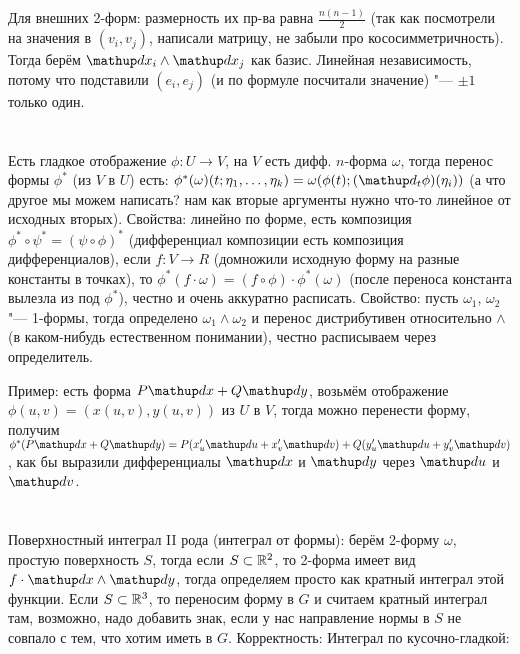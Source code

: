 Для внешних 2-форм: размерность их пр-ва равна $\frac{n(n-1)}{2}$ (так как посмотрели на значения в $(v_i, v_j)$, написали матрицу, не забыли про кососимметричность).
Тогда берём $\d x_i \wedge \d x_j$ как базис.
Линейная независимость, потому что подставили $(e_i, e_j)$ (и по формуле посчитали значение) "--- $\pm 1$ только один.

\section{} %
Есть гладкое отображение $\phi \colon U \to V$, на $V$ есть дифф. $n$-форма $\omega$, тогда перенос формы $\phi^*$ (из $V$ в $U$) есть:
$\phi^*(\omega)(t;\eta_1, \dots, \eta_k)=\omega(\phi(t);(\d_t\phi)(\eta_i))$ (а что другое мы можем написать? нам как вторые аргументы нужно что-то линейное от исходных вторых).
Свойства: линейно по форме, есть композиция $\phi^* \circ \psi^* = (\psi \circ \phi)^*$ (дифференциал композиции есть композиция дифференциалов),
если $f \colon V \to R$ (домножили исходную форму на разные константы в точках), то $\phi^*(f \cdot \omega) = (f \circ \phi) \cdot \phi^*(\omega)$
(после переноса константа вылезла из под $\phi^*$), честно и очень аккуратно расписать.
Свойство: пусть $\omega_1$, $\omega_2$ "--- 1-формы, тогда определено $\omega_1 \wedge \omega_2$ и перенос дистрибутивен относительно $\wedge$ (в каком-нибудь
естественном понимании), честно расписываем через определитель.

Пример: есть форма $P\d x + Q\d y$, возьмём отображение $\phi(u, v) = (x(u, v), y(u, v))$ из $U$ в $V$, тогда можно перенести форму,
получим $\phi^*(P\d x + Q\d y) = P(x_u' \d u + x_v' \d v) + Q(y_u' \d u + y_v' \d v)$, как бы выразили дифференциалы $\d x$ и $\d y$
через $\d u$ и $\d v$.

\section{} %
Поверхностный интеграл II рода (интеграл от формы): берём 2-форму $\omega$, простую поверхность $S$, тогда если
$S \subset \mathbb{R}^2$, то 2-форма имеет вид $f\cdot \d x \wedge \d y$, тогда определяем просто как кратный интеграл этой функции.
Если $S \subset \mathbb{R}^3$, то переносим форму в $G$ и считаем кратный интеграл там, возможно, надо добавить знак, если у нас
направление нормы в $S$ не совпало с тем, что хотим иметь в $G$.
Корректность: \TODO
Интеграл по кусочно-гладкой: \TODO


